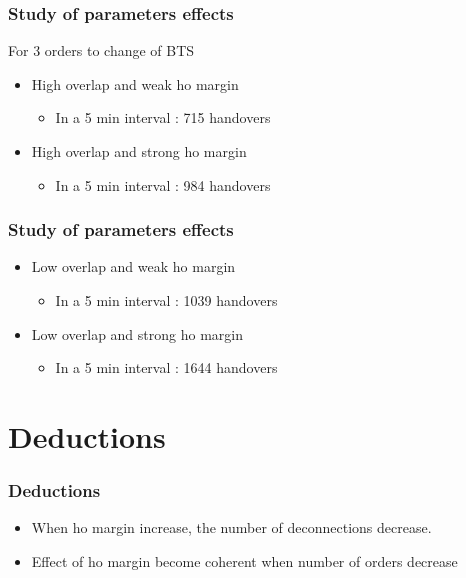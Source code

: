 \documentclass{beamer}
\begin{document}
\begin{frame}
\frametitle{Study of parameters effects}
For 3 orders to change of BTS
\begin{itemize}
 \item High overlap and weak ho margin
  \begin{itemize}
    \item In a 5 min interval : 715 handovers
  \end{itemize}
 \item High overlap and strong ho margin
  \begin{itemize}
    \item In a 5 min interval : 984 handovers
  \end{itemize}
\end{itemize}
\end{frame}
\begin{frame}
\frametitle{Study of parameters effects}
\begin{itemize}
  \item Low overlap and weak ho margin
  \begin{itemize}
    \item In a 5 min interval : 1039 handovers
  \end{itemize}
  \item Low overlap and strong ho margin
  \begin{itemize}
    \item In a 5 min interval : 1644 handovers
  \end{itemize}
\end{itemize}
\end{frame}
\section{Deductions}

\begin{frame}
\frametitle{Deductions}
\begin{itemize}
  \item When ho margin increase, the number of deconnections decrease.
  \item Effect of ho margin become coherent when number of orders decrease
\end{itemize}
\end{frame}
\end{document}
